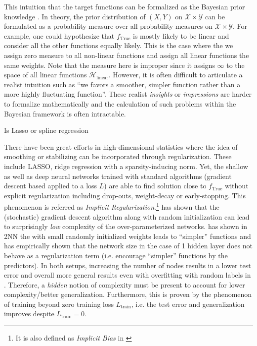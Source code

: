 This intuition that the target functions can be formalized as the Bayesian prior
knowledge \TOCITE. In theory, the prior distribution of $(X, Y)$ on $\mathcal{X}
\times \mathcal{Y}$ can be formulated as a probability measure over all
probability measures on $\mathcal{X} \times \mathcal{Y}$.  For example, one
could hypothesize that $f_{\text{True}}$ is mostly likely to be linear and
consider all the other functions equally likely. This is the case where the we
assign zero measure to all non-linear functions and assign all linear functions
the same weights. Note that the measure here is improper since it assigns
$\infty$ to the space of all linear functions $\mathcal{H}_{\text{linear}}$.
However, it is often difficult to articulate a realist intuition such as ``we
favors a smoother, simpler function rather than a more highly fluctuating
function''. These realist \textit{insights} or \textit{impressions} are
harder to formalize mathematically and the calculation of such problems within
the Bayesian framework is often intractable.

Is Lasso or spline regression 


There have been great efforts in high-dimensional statistics where the idea
of smoothing or stabilizing can be incorporated through regularization. These
include LASSO, ridge regression with a sparsity-inducing norm. Yet, the shallow
as well as deep neural networks \cite{neyshaburSearchRealInductive2015,
maennelGradientDescentQuantizes2018, liLearningOverparameterizedNeural2019,
kuboImplicitRegularizationOverparameterized2019,
neyshaburImplicitRegularizationDeep2017} trained with standard algorithms
(gradient descent based applied to a loss $L$) are able to find solution close
to $f_{\text{True}}$ without explicit regularization including drop-outs,
weight-decay or early-stopping. This phenomenon is referred as \textit{Implicit
Regularization}.\footnote{ It is also defined as \textit{Implicit Bias} in
\cite{soudryImplicitBiasGradient2022} }
\cite{kuboImplicitRegularizationOverparameterized2019} has shown that the
(stochastic) gradient descent algorithm along with random initialization can
lead to surprisingly \textit{low} complexity of the over-parameterized networks.
\cite{maennelGradientDescentQuantizes2018} has shown in 2NN the with small
randomly initialized weights leads to ``simpler'' functions and
\cite{maennelGradientDescentQuantizes2018, neyshaburSearchRealInductive2015} has
empirically shown that the network size in the case of 1 hidden layer does not
behave as a regularization term (i.e. encourage ``simpler'' functions by the
predictors). In both setups, increasing the number of nodes results in a lower
test error and overall more general results even with overfitting with random
labels in \cite{neyshaburSearchRealInductive2015}. Therefore, a \textit{hidden}
notion of complexity must be present to account for lower complexity/better
generalization. Furthermore, this is proven by the phenomenon of training beyond
zero training loss \TOCITE $L_{\text{train}}$, i.e. the test error and
generalization improves despite $L_{\text{train}} = 0$.

